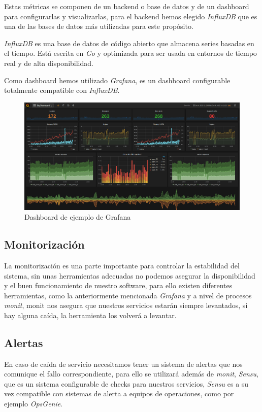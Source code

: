 \documentclass[12pt,a4paperpaper,]{report}
\begin{document}
Estas métricas se componen de un backend o base de datos y de un
dashboard para configurarlas y visualizarlas, para el backend hemos
elegido \emph{InfluxDB} que es una de las bases de datos más utilizadas
para este propósito.

\emph{InfluxDB} es una base de datos de código abierto que almacena
series basadas en el tiempo. Está escrita en \emph{Go} y optimizada para
ser usada en entornos de tiempo real y de alta disponibilidad.

Como dashboard hemos utilizado \emph{Grafana}, es un dashboard
configurable totalmente compatible con \emph{InfluxDB}.

\begin{figure}
\centering
\includegraphics{source/figures/dashboard.png}
\caption{Dashboard de ejemplo de Grafana \label{dashboard}}
\end{figure}

\subsection{Monitorización}\label{monitorizaciuxf3n}

La monitorización es una parte importante para controlar la estabilidad
del sistema, sin unas herramientas adecuadas no podemos asegurar la
disponibilidad y el buen funcionamiento de nuestro software, para ello
existen diferentes herramientas, como la anteriormente mencionada
\emph{Grafana} y a nivel de procesos \emph{monit}, monit nos asegura que
nuestros servicios estarán siempre levantados, si hay alguna caída, la
herramienta los volverá a levantar.

\subsection{Alertas}\label{alertas}

En caso de caída de servicio necesitamos tener un sistema de alertas que
nos comunique el fallo correspondiente, para ello se utilizará además de
\emph{monit}, \emph{Sensu}, que es un sistema configurable de checks
para nuestros servicios, \emph{Sensu} es a su vez compatible con
sistemas de alerta a equipos de operaciones, como por ejemplo
\emph{OpsGenie}.
\end{document}

